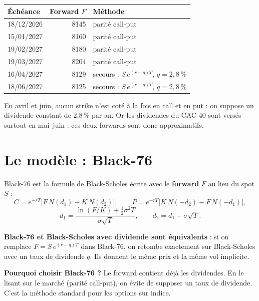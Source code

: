 \documentclass[11pt,a4paper]{article}
\begin{document}
\begin{center}
\begin{tabular}{lrl}
\toprule
Échéance & Forward $F$ & Méthode \\
\midrule
18/12/2026 & 8145 & parité call-put \\
15/01/2027 & 8160 & parité call-put \\
19/02/2027 & 8180 & parité call-put \\
19/03/2027 & 8204 & parité call-put \\
16/04/2027 & 8129 & secours : $S\,e^{(r-q)T}$, $q = 2{,}8\,\%$ \\
18/06/2027 & 8125 & secours : $S\,e^{(r-q)T}$, $q = 2{,}8\,\%$ \\
\bottomrule
\end{tabular}
\end{center}

\begin{alimite}
En avril et juin, aucun strike n'est coté à la fois en call et en put : on suppose un dividende
constant de 2,8\,\% par an. Or les dividendes du CAC 40 sont versés surtout en mai--juin :
ces deux forwards sont donc approximatifs.
\end{alimite}

\section{Le modèle : Black-76}

Black-76 est la formule de Black-Scholes écrite avec le \textbf{forward} $F$ au lieu du spot $S$ :
\[
  C = e^{-rT}\big[F\,N(d_1) - K\,N(d_2)\big], \qquad
  P = e^{-rT}\big[K\,N(-d_2) - F\,N(-d_1)\big],
\]
\[
  d_1 = \frac{\ln(F/K) + \tfrac12 \sigma^2 T}{\sigma\sqrt{T}}, \qquad d_2 = d_1 - \sigma\sqrt{T}.
\]

\begin{aretenir}
\textbf{Black-76 et Black-Scholes avec dividende sont équivalents} : si on remplace
$F = S\,e^{(r-q)T}$ dans Black-76, on retombe exactement sur Black-Scholes avec un taux de
dividende $q$. Ils donnent le même prix et la même vol implicite.

\textbf{Pourquoi choisir Black-76 ?} Le forward contient déjà les dividendes. En le lisant sur
le marché (parité call-put), on évite de supposer un taux de dividende. C'est la méthode
standard pour les options sur indice.
\end{aretenir}
\end{document}
